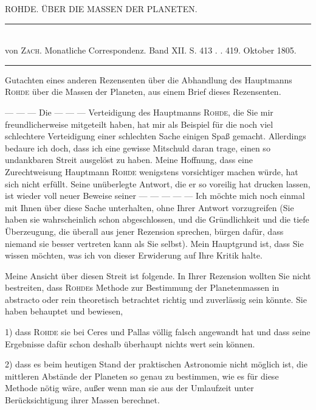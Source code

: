\clearpage
{}
\begin{center}
{\large ROHDE. ÜBER DIE MASSEN DER PLANETEN.\par}
\medskip
\rule{0.55\linewidth}{0.4pt}\\[2pt]
von \textsc{Zach}. Monatliche Correspondenz. Band XII. S. 413 . . 419. Oktober 1805.\\[2pt]
\rule{0.55\linewidth}{0.4pt}
\end{center}
\begin{center}Gutachten eines anderen Rezensenten über die Abhandlung des Hauptmanns \textsc{Rohde} über die Massen der Planeten, aus einem Brief dieses Rezensenten.\end{center}

\noindent --- --- --- Die --- --- --- Verteidigung des Hauptmanns \textsc{Rohde}, die Sie mir freundlicherweise mitgeteilt haben, hat mir als Beispiel für die noch viel schlechtere Verteidigung einer schlechten Sache einigen Spaß gemacht. Allerdings bedaure ich doch, dass ich eine gewisse Mitschuld daran trage, einen so undankbaren Streit ausgelöst zu haben. Meine Hoffnung, dass eine Zurechtweisung Hauptmann \textsc{Rohde} wenigstens vorsichtiger machen würde, hat sich nicht erfüllt. Seine unüberlegte Antwort, die er so voreilig hat drucken lassen, ist wieder voll neuer Beweise seiner --- --- --- --- --- Ich möchte mich noch einmal mit Ihnen über diese Sache unterhalten, ohne Ihrer Antwort vorzugreifen (Sie haben sie wahrscheinlich schon abgeschlossen, und die Gründlichkeit und die tiefe Überzeugung, die überall aus jener Rezension sprechen, bürgen dafür, dass niemand sie besser vertreten kann als Sie selbst). Mein Hauptgrund ist, dass Sie wissen möchten, was ich von dieser Erwiderung auf Ihre Kritik halte.

Meine Ansicht über diesen Streit ist folgende. In Ihrer Rezension wollten Sie nicht bestreiten, dass \textsc{Rohde}s Methode zur Bestimmung der Planetenmassen in abstracto oder rein theoretisch betrachtet richtig und zuverlässig sein könnte. Sie haben behauptet und bewiesen,

1) dass \textsc{Rohde} sie bei Ceres und Pallas völlig falsch angewandt hat und dass seine Ergebnisse dafür schon deshalb überhaupt nichts wert sein können.

2) dass es beim heutigen Stand der praktischen Astronomie nicht möglich ist, die mittleren Abstände der Planeten so genau zu bestimmen, wie es für diese Methode nötig wäre, außer wenn man sie aus der Umlaufzeit unter Berücksichtigung ihrer Massen berechnet.


